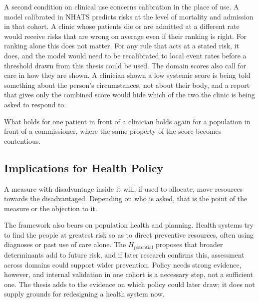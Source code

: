 A second condition on clinical use concerns calibration in the place of use. A
model calibrated in NHATS predicts risks at the level of mortality and admission
in that cohort. A clinic whose patients die or are admitted at a different rate
would receive risks that are wrong on average even if their ranking is right. For
ranking alone this does not matter. For any rule that acts at a stated risk, it
does, and the model would need to be recalibrated to local event rates before a
threshold drawn from this thesis could be used. The domain scores also call for
care in how they are shown. A clinician shown a low systemic score is being told
something about the person's circumstances, not about their body, and a report
that gives only the combined score would hide which of the two the clinic is being
asked to respond to.

What holds for one patient in front of a clinician holds again for a population
in front of a commissioner, where the same property of the score becomes
contentious.

\subsection{Implications for Health Policy}
\label{sec:disc-impl-policy}

A measure with disadvantage inside it will, if used to allocate, move resources
towards the disadvantaged. Depending on who is asked, that is the point of the
measure or the objection to it.

The framework also bears on population health and planning. Health systems try to find the people at greatest risk so as to direct preventive resources, often using diagnoses or past use of care alone. The $H_{\text{potential}}$ proposes that broader determinants add to future risk, and if later research confirms this, assessment across domains could support wider prevention. Policy needs strong evidence, however, and internal validation in one cohort is a necessary step, not a sufficient one. The thesis adds to the evidence on which policy could later draw; it does not supply grounds for redesigning a health system now.

